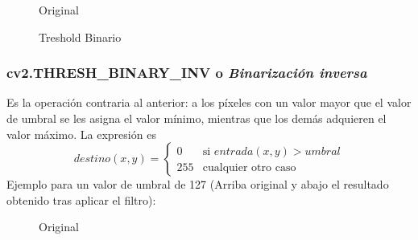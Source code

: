 \begin{figure}[H]
  \caption{Original}
  \centering \setlength\fboxsep{0pt} \setlength\fboxrule{0.5pt}
\end{figure}

\begin{figure}[H]
  \centering \setlength\fboxsep{0pt} \setlength\fboxrule{0.5pt}
  \caption{Treshold Binario}
\end{figure}

\subsubsection{cv2.THRESH\_BINARY\_INV o \emph{Binarización inversa}}
Es la operación contraria al anterior: a los píxeles con un valor
mayor que el valor de umbral se les asigna el valor mínimo, mientras
que los demás adquieren el valor máximo. La expresión es
\begin{equation*}
  destino(x, y) =
  \begin{cases}
    0 & \text{si } entrada(x, y) > umbral \\
    255 & \text{cualquier otro caso}
  \end{cases}
\end{equation*}
Ejemplo para un valor de umbral de 127 (Arriba original y abajo el
resultado obtenido tras aplicar el filtro):

\begin{figure}[H]
  \caption{Original}
  \centering \setlength\fboxsep{0pt} \setlength\fboxrule{0.5pt}
\end{figure}

